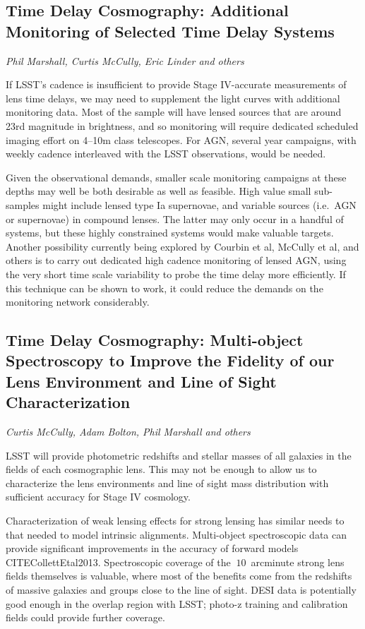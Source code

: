 \begin{enumerate}

\subsection{Time Delay Cosmography: Additional Monitoring of Selected Time Delay Systems}
{\it Phil Marshall, Curtis McCully, Eric Linder and others}

If LSST's cadence is insufficient to provide Stage IV-accurate
measurements of lens time delays, we may need to supplement the light
curves with additional monitoring data. Most of the sample will have
lensed sources that are around 23rd magnitude in brightness, and so
monitoring will require dedicated scheduled imaging effort on 4--10m
class telescopes. For AGN, several year campaigns, with
weekly cadence interleaved with the LSST observations, would be needed.

Given the observational demands,
smaller scale monitoring campaigns at these depths may well be
both desirable as well as feasible. High value small sub-samples might include
lensed type Ia supernovae, and variable sources (i.e.\ AGN or
supernovae) in compound lenses.
The latter may only occur in a handful of systems, but
these highly constrained systems would make valuable targets. Another
possibility currently being explored by Courbin et al, McCully et al,
and others is to carry out dedicated high cadence monitoring of lensed
AGN, using the very short time scale variability to probe the time delay
more efficiently. If this technique can be shown to work, it could
reduce the demands on the monitoring network considerably.


\subsection{Time Delay Cosmography: Multi-object Spectroscopy to Improve the Fidelity of our Lens Environment and Line of Sight Characterization}
{\it Curtis McCully, Adam Bolton, Phil Marshall and others}

LSST will provide photometric redshifts and stellar masses of all
galaxies in the fields of each cosmographic lens. This may not be enough
to allow us to characterize the lens environments and line of sight mass
distribution with sufficient accuracy for Stage IV cosmology.

Characterization of weak lensing effects for strong lensing has
similar needs to that needed to model intrinsic alignments. Multi-object
spectroscopic data can provide significant improvements in
the accuracy of forward models CITE{CollettEtal2013}.
Spectroscopic coverage of the $~10$~arcminute strong lens fields
themselves is valuable, where most of the benefits come from the redshifts of
massive galaxies and groups close to the line of sight. DESI data is
potentially good enough in the overlap region with LSST;
photo-z training and calibration fields could provide further coverage.



\end{enumerate}
